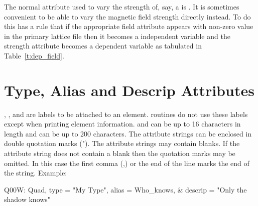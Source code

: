 The normal attribute used to vary the strength of, say, a
 is .  It is sometimes convenient to be able to
vary the magnetic field strength directly instead. To do this \bmad has
a rule that if the appropriate field attribute appears with non-zero value in the
primary lattice file then it becomes a independent variable and the strength attribute
becomes a dependent variable as tabulated in Table~\ref{t:dep_field}.
\begin{table}[h]
\caption {Field and Strength Attributes.}
\label{t:dep_field}
\end{table}

\section{Type, Alias and Descrip Attributes}
\label{s:string}

, , and  are labels to be attached 
to an element. \bmad routines do not use these labels except 
when printing element information. 
and  can be up to 16 characters in length and 
can be up to 200 characters. The attribute strings can be enclosed in
double quotation marks ("). The attribute strings may contain
blanks. If the attribute string does not contain a blank then the
quotation marks may be omitted. In this case the first comma (,) or
the end of the line marks the end of the string. Example:
\begin{example}
  Q00W: Quad, type = "My Type", alias = Who_knows, &
                                  descrip = "Only the shadow knows"
\end{example}

